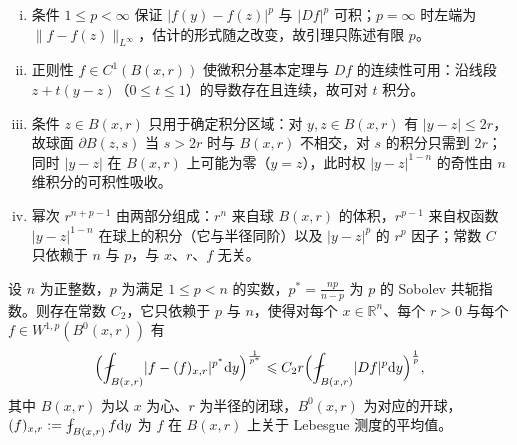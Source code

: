 \documentclass[../../main.tex]{subfiles}%
\begin{document}
\begin{remark}\label{remark:ch04-lem-4-1-条件}
\begin{enumerate}[(i)]
\item 条件 $1\leqslant p<\infty$ 保证 $\lvert f(y)-f(z)\rvert^{p}$ 与 $\lvert Df\rvert^{p}$ 可积；$p=\infty$ 时左端为 $\lVert f-f(z)\rVert_{L^\infty}$，估计的形式随之改变，故引理只陈述有限 $p$。
\item 正则性 $f\in C^1(B(x,r))$ 使微积分基本定理与 $Df$ 的连续性可用：沿线段 $z+t(y-z)$（$0\leqslant t\leqslant1$）的导数存在且连续，故可对 $t$ 积分。
\item 条件 $z\in B(x,r)$ 只用于确定积分区域：对 $y,z\in B(x,r)$ 有 $\lvert y-z\rvert\leqslant 2r$，故球面 $\partial B(z,s)$ 当 $s>2r$ 时与 $B(x,r)$ 不相交，对 $s$ 的积分只需到 $2r$；同时 $\lvert y-z\rvert$ 在 $B(x,r)$ 上可能为零（$y=z$），此时权 $\lvert y-z\rvert^{1-n}$ 的奇性由 $n$ 维积分的可积性吸收。
\item 幂次 $r^{n+p-1}$ 由两部分组成：$r^{n}$ 来自球 $B(x,r)$ 的体积，$r^{p-1}$ 来自权函数 $\lvert y-z\rvert^{1-n}$ 在球上的积分（它与半径同阶）以及 $\lvert y-z\rvert^{p}$ 的 $r^{p}$ 因子；常数 $C$ 只依赖于 $n$ 与 $p$，与 $x$、$r$、$f$ 无关。
\end{enumerate}
\end{remark}

\begin{theorem}\label{theorem:ch04-4-9}
设 $n$ 为正整数，$p$ 为满足 $1\leqslant p<n$ 的实数，$p^*=\frac{np}{n-p}$ 为 $p$ 的 Sobolev 共轭指数。则存在常数 $C_2$，它只依赖于 $p$ 与 $n$，使得对每个 $x\in\mathbb{R}^n$、每个 $r>0$ 与每个 $f\in W^{1,p}(B^{0}(x,r))$ 有
\begin{align*}
\Bigl(\fint_{B(x,r)}\lvert f-(f)_{x,r}\rvert^{p^*}\diff y\Bigr)^{\frac{1}{p^*}}\leqslant C_2r\Bigl(\fint_{B(x,r)}\lvert Df\rvert^{p}\diff y\Bigr)^{\frac{1}{p}},
\end{align*}
其中 $B(x,r)$ 为以 $x$ 为心、$r$ 为半径的闭球，$B^{0}(x,r)$ 为对应的开球，$(f)_{x,r}:=\fint_{B(x,r)}f\diff y$ 为 $f$ 在 $B(x,r)$ 上关于 Lebesgue 测度的平均值。
\end{theorem}
\end{document}

